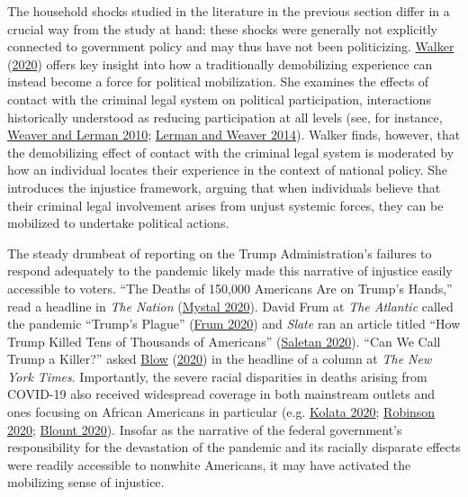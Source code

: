 \documentclass[
  12pt,
]{article}
\begin{document}
The household shocks studied in the literature in the previous section differ in a crucial way from the study at hand: these shocks were generally not explicitly connected to government policy and may thus have not been politicizing. \protect\hyperlink{ref-Walker2020}{Walker} (\protect\hyperlink{ref-Walker2020}{2020}) offers key insight into how a traditionally demobilizing experience can instead become a force for political mobilization. She examines the effects of contact with the criminal legal system on political participation, interactions historically understood as reducing participation at all levels (see, for instance, \protect\hyperlink{ref-Weaver2010}{Weaver and Lerman 2010}; \protect\hyperlink{ref-Lerman2014}{Lerman and Weaver 2014}). Walker finds, however, that the demobilizing effect of contact with the criminal legal system is moderated by how an individual locates their experience in the context of national policy. She introduces the injustice framework, arguing that when individuals believe that their criminal legal involvement arises from unjust systemic forces, they can be mobilized to undertake political actions.

The steady drumbeat of reporting on the Trump Administration's failures to respond adequately to the pandemic likely made this narrative of injustice easily accessible to voters. ``The Deaths of 150,000 Americans Are on Trump's Hands,'' read a headline in \emph{The Nation} (\protect\hyperlink{ref-Mystal2020}{Mystal 2020}). David Frum at \emph{The Atlantic} called the pandemic ``Trump's Plague'' (\protect\hyperlink{ref-Frum2020}{Frum 2020}) and \emph{Slate} ran an article titled ``How Trump Killed Tens of Thousands of Americans'' (\protect\hyperlink{ref-Saletan2020}{Saletan 2020}). ``Can We Call Trump a Killer?'' asked \protect\hyperlink{ref-Blow2020}{Blow} (\protect\hyperlink{ref-Blow2020}{2020}) in the headline of a column at \emph{The New York Times}. Importantly, the severe racial disparities in deaths arising from COVID-19 also received widespread coverage in both mainstream outlets and ones focusing on African Americans in particular (e.g. \protect\hyperlink{ref-Kolata2020}{Kolata 2020}; \protect\hyperlink{ref-Robinson2020}{Robinson 2020}; \protect\hyperlink{ref-Blount2020}{Blount 2020}). Insofar as the narrative of the federal government's responsibility for the devastation of the pandemic and its racially disparate effects were readily accessible to nonwhite Americans, it may have activated the mobilizing sense of injustice.
\end{document}
